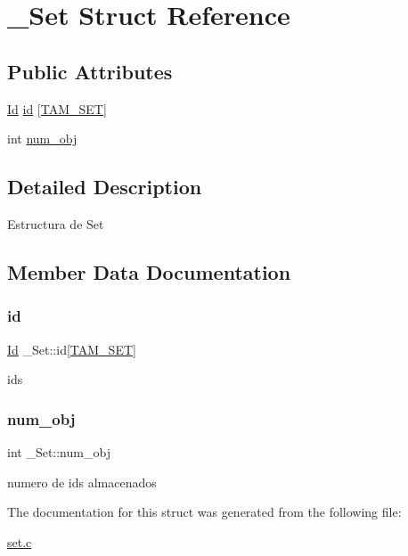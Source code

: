 \hypertarget{struct__Set}{}\section{\+\_\+\+Set Struct Reference}
\label{struct__Set}
\subsection*{Public Attributes}
\begin{DoxyCompactItemize}
\item 
\hyperlink{types_8h_a845e604fb28f7e3d97549da3448149d3}{Id} \hyperlink{struct__Set_aaa814a92620bfdb539ed25be204a3079}{id} \mbox{[}\hyperlink{set_8h_a24b51e1a036e3b382adcc8216239aafd}{T\+A\+M\+\_\+\+S\+ET}\mbox{]}
\item 
int \hyperlink{struct__Set_a6d4c5bc1c085564602a0e93fe074ad91}{num\+\_\+obj}
\end{DoxyCompactItemize}


\subsection{Detailed Description}
Estructura de Set 

\subsection{Member Data Documentation}
\mbox{\label{struct__Set_aaa814a92620bfdb539ed25be204a3079}} 
\subsubsection{\texorpdfstring{id}{id}}
{\footnotesize\ttfamily \hyperlink{types_8h_a845e604fb28f7e3d97549da3448149d3}{Id} \+\_\+\+Set\+::id\mbox{[}\hyperlink{set_8h_a24b51e1a036e3b382adcc8216239aafd}{T\+A\+M\+\_\+\+S\+ET}\mbox{]}}

ids \mbox{\label{struct__Set_a6d4c5bc1c085564602a0e93fe074ad91}} 
\subsubsection{\texorpdfstring{num\+\_\+obj}{num\_obj}}
{\footnotesize\ttfamily int \+\_\+\+Set\+::num\+\_\+obj}

numero de ids almacenados 

The documentation for this struct was generated from the following file\+:\begin{DoxyCompactItemize}
\item 
\hyperlink{set_8c}{set.\+c}\end{DoxyCompactItemize}
